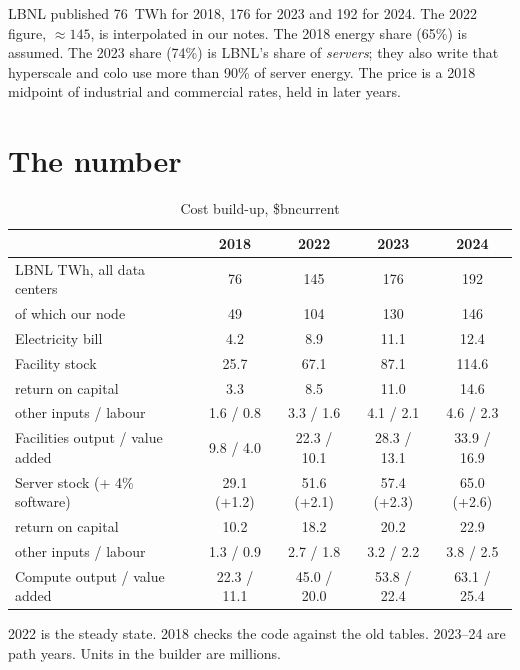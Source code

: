 \documentclass[11pt]{article}
\newcommand{\bn}{\$bn}
\begin{document}
LBNL published 76~TWh for 2018, 176 for 2023 and 192 for 2024. The 2022 figure, $\approx 145$, is interpolated in our notes. The 2018 energy share (65\%) is assumed. The 2023 share (74\%) is LBNL's share of \emph{servers}; they also write that hyperscale and colo use more than 90\% of server energy. The price is a 2018 midpoint of industrial and commercial rates, held in later years.

\section{The number}

\begin{table}[ht]
\centering
\begin{threeparttable}
\caption{Cost build-up, \bn current}
\label{tab:cost}
\begin{tabular}{lcccc}
\toprule
 & 2018 & 2022 & 2023 & 2024 \\
\midrule
LBNL TWh, all data centers & 76 & 145 & 176 & 192 \\
\quad of which our node & 49 & 104 & 130 & 146 \\
Electricity bill & 4.2 & 8.9 & 11.1 & 12.4 \\
\addlinespace
Facility stock & 25.7 & 67.1 & 87.1 & 114.6 \\
\quad return on capital & 3.3 & 8.5 & 11.0 & 14.6 \\
\quad other inputs / labour & 1.6 / 0.8 & 3.3 / 1.6 & 4.1 / 2.1 & 4.6 / 2.3 \\
Facilities output / value added & 9.8 / 4.0 & 22.3 / 10.1 & 28.3 / 13.1 & 33.9 / 16.9 \\
\addlinespace
Server stock (+ 4\% software) & 29.1 (+1.2) & 51.6 (+2.1) & 57.4 (+2.3) & 65.0 (+2.6) \\
\quad return on capital & 10.2 & 18.2 & 20.2 & 22.9 \\
\quad other inputs / labour & 1.3 / 0.9 & 2.7 / 1.8 & 3.2 / 2.2 & 3.8 / 2.5 \\
Compute output / value added & 22.3 / 11.1 & 45.0 / 20.0 & 53.8 / 22.4 & 63.1 / 25.4 \\
\bottomrule
\end{tabular}
\begin{tablenotes}\footnotesize
\item 2022 is the steady state. 2018 checks the code against the old tables. 2023--24 are path years. Units in the builder are millions.
\end{tablenotes}
\end{threeparttable}
\end{table}
\end{document}
